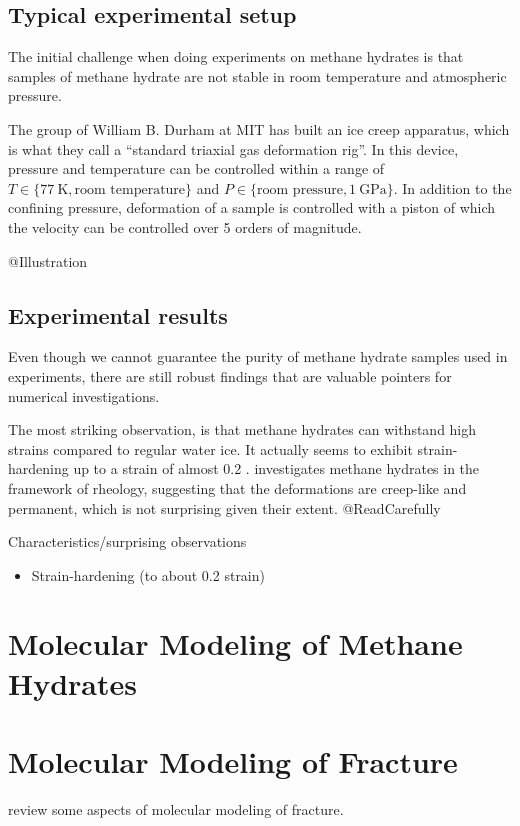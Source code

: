 \subsection{Typical experimental setup}
The initial challenge when doing experiments on methane hydrates is that samples of methane hydrate are not stable in room temperature and atmospheric pressure.

The group of William B. Durham at MIT has built an ice creep apparatus, which is what they call a ``standard triaxial gas deformation rig''. In this device, pressure and temperature can be controlled within a range of $T \in \{\SI{77}{\kelvin}, \text{room temperature}\}$ and $P \in \{\text{room pressure}, \SI{1}{\giga\pascal}\}$. In addition to the confining pressure, deformation of a sample is controlled with a piston of which the velocity can be controlled over 5 orders of magnitude.

@Illustration

\subsection{Experimental results}
Even though we cannot guarantee the purity of methane hydrate samples used in experiments, there are still robust findings that are valuable pointers for numerical investigations. 

The most striking observation, is that methane hydrates can withstand high strains compared to regular water ice. It actually seems to exhibit strain-hardening up to a strain of almost 0.2 \cite{Durham2003, Stern1998}. \cite{Durham2003} investigates methane hydrates in the framework of rheology, suggesting that the deformations are creep-like and permanent, which is not surprising given their extent. @ReadCarefully 

Characteristics/surprising observations
\begin{itemize}
\item Strain-hardening (to about 0.2 strain)
\end{itemize}

\section{Molecular Modeling of Methane Hydrates}

\section{Molecular Modeling of Fracture}
\cite{doi:10.1142/9789812773326_0001} review some aspects of molecular modeling of fracture. 

